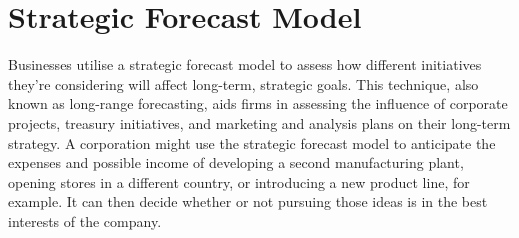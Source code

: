 \documentclass{article}
\begin{document}
\section{Strategic Forecast Model}
Businesses utilise a strategic forecast model to assess how different initiatives they're considering will affect long-term, strategic goals. This technique, also known as long-range forecasting, aids firms in assessing the influence of corporate projects, treasury initiatives, and marketing and analysis plans on their long-term strategy. A corporation might use the strategic forecast model to anticipate the expenses and possible income of developing a second manufacturing plant, opening stores in a different country, or introducing a new product line, for example. It can then decide whether or not pursuing those ideas is in the best interests of the company.
\end{document}
